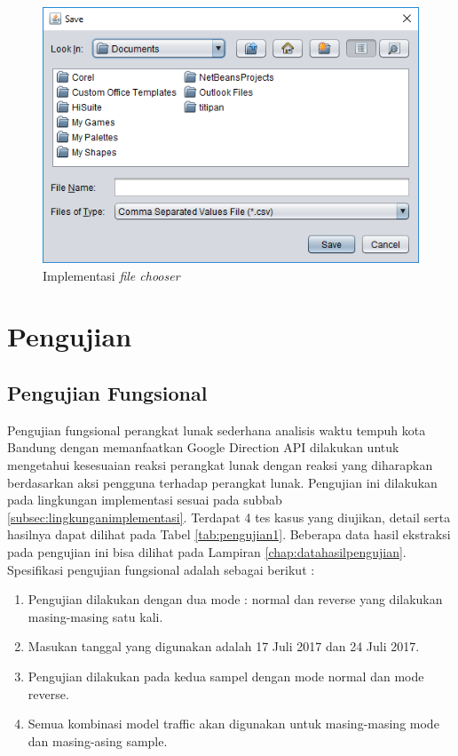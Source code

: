 \begin{figure}[H]
				\centering		
				\includegraphics[scale=0.7]{Gambar/gui2.png}
				\caption[Implementasi \textit{file chooser}]{Implementasi \textit{file chooser}}
				\label{fig:implementasifilechooser}	
			\end{figure}
			
\section{Pengujian}
\label{sec:pengujian}

\subsection{Pengujian Fungsional}
\label{subsec:pengujianfungsional}

Pengujian fungsional perangkat lunak sederhana analisis waktu tempuh kota Bandung dengan memanfaatkan Google Direction API dilakukan untuk mengetahui kesesuaian reaksi perangkat lunak dengan reaksi yang diharapkan berdasarkan aksi pengguna terhadap perangkat lunak. Pengujian ini dilakukan pada lingkungan implementasi sesuai pada subbab \ref{subsec:lingkunganimplementasi}. Terdapat 4 tes kasus yang diujikan, detail serta hasilnya dapat dilihat pada Tabel \ref{tab:pengujian1}. Beberapa data hasil ekstraksi pada pengujian ini bisa dilihat pada Lampiran \ref{chap:datahasilpengujian}. Spesifikasi pengujian fungsional adalah sebagai berikut :
\begin{enumerate}
	\item Pengujian dilakukan dengan dua mode : normal dan reverse yang dilakukan masing-masing satu kali.
	\item Masukan tanggal yang digunakan adalah 17 Juli 2017 dan 24 Juli 2017.
	\item Pengujian dilakukan pada kedua sampel dengan mode normal dan mode reverse.
	\item Semua kombinasi model traffic akan digunakan untuk masing-masing mode dan masing-asing sample.
\end{enumerate}

